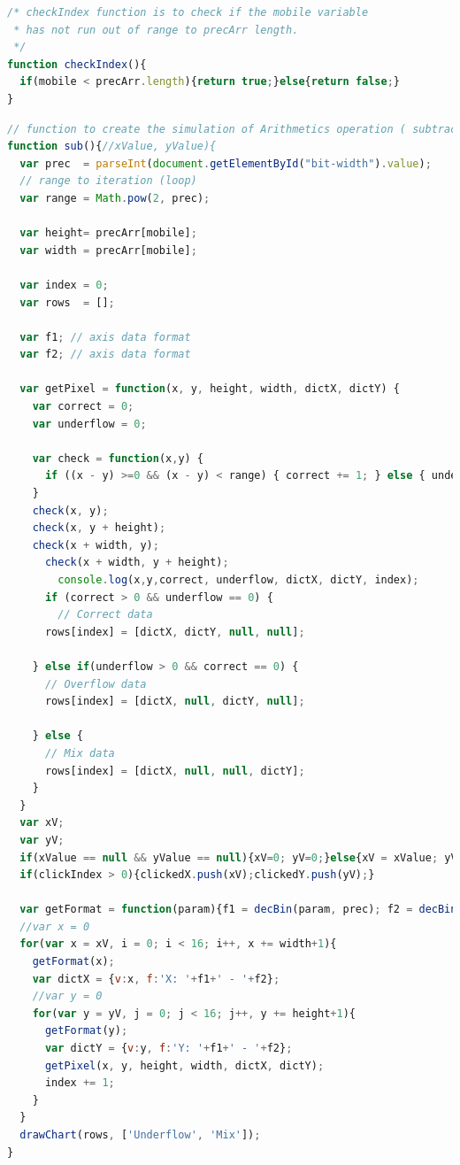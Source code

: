 \documentclass[11pt]{article}
\begin{document}
\begin{lstlisting}[label={lst:checkIndex}, language=Javascript, caption={check if the mobile variable has not run out of range to precArr length.},]
/* checkIndex function is to check if the mobile variable 
 * has not run out of range to precArr length. 
 */
function checkIndex(){
  if(mobile < precArr.length){return true;}else{return false;}
}
\end{lstlisting}

\begin{lstlisting}[label={lst:sub}, language=Javascript, caption={sub function},]
// function to create the simulation of Arithmetics operation ( subtraction )
function sub(){//xValue, yValue){
  var prec  = parseInt(document.getElementById("bit-width").value);
  // range to iteration (loop)
  var range = Math.pow(2, prec);

  var height= precArr[mobile];
  var width = precArr[mobile];

  var index = 0;
  var rows  = [];

  var f1; // axis data format 
  var f2; // axis data format

  var getPixel = function(x, y, height, width, dictX, dictY) {
    var correct = 0;
    var underflow = 0;

    var check = function(x,y) {
      if ((x - y) >=0 && (x - y) < range) { correct += 1; } else { underflow += 1; }  
    }
    check(x, y);
    check(x, y + height);
    check(x + width, y);
      check(x + width, y + height);
        console.log(x,y,correct, underflow, dictX, dictY, index);
      if (correct > 0 && underflow == 0) {
        // Correct data
      rows[index] = [dictX, dictY, null, null];

    } else if(underflow > 0 && correct == 0) {
      // Overflow data
      rows[index] = [dictX, null, dictY, null];

    } else {
      // Mix data
      rows[index] = [dictX, null, null, dictY];
    }
  }
  var xV;
  var yV; 
  if(xValue == null && yValue == null){xV=0; yV=0;}else{xV = xValue; yV = yValue;}
  if(clickIndex > 0){clickedX.push(xV);clickedY.push(yV);}
  
  var getFormat = function(param){f1 = decBin(param, prec); f2 = decBin(param+height, prec);}
  //var x = 0
  for(var x = xV, i = 0; i < 16; i++, x += width+1){
    getFormat(x);
    var dictX = {v:x, f:'X: '+f1+' - '+f2};
    //var y = 0
    for(var y = yV, j = 0; j < 16; j++, y += height+1){
      getFormat(y);
      var dictY = {v:y, f:'Y: '+f1+' - '+f2};
      getPixel(x, y, height, width, dictX, dictY);
      index += 1;
    }
  }
  drawChart(rows, ['Underflow', 'Mix']);
}
\end{lstlisting}
\end{document}
